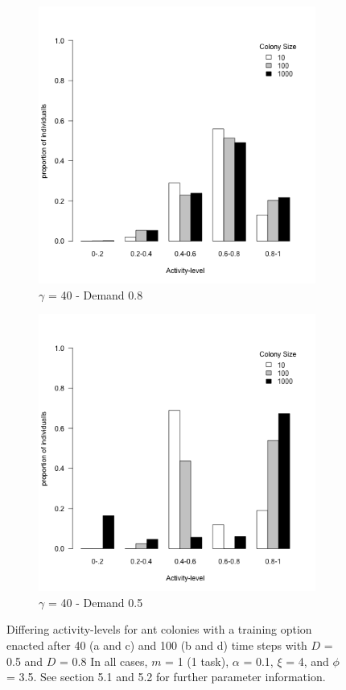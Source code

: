 \documentclass[a4paper]{article}
\begin{document}
\begin{figure}[!ht]
     \begin{subfigure}[b]{0.45\linewidth}
      \includegraphics[width=\linewidth]{Boredom_40_and_8}
      \caption{$\gamma$ = 40 - Demand 0.8}\label{fig:3c}
    \end{subfigure}
    \hfill
    \begin{subfigure}[b]{0.45\linewidth}
      \includegraphics[width=\linewidth]{Boredom_100_and_8}
      \caption{$\gamma$ = 40 - Demand 0.5}\label{fig:3d}
     \end{subfigure}
     \caption{Differing activity-levels for ant colonies with a training option enacted after 40 (a and c) and 100 (b and d) time steps with $D$ = 0.5 and $D$ = 0.8 In all cases, $m$ = 1 (1 task), $\alpha$ = 0.1, $\xi$ = 4, and $\phi$ = 3.5.  See section 5.1 and 5.2 for further parameter information.}\label{fig:3}



\end{figure}
\end{document}
